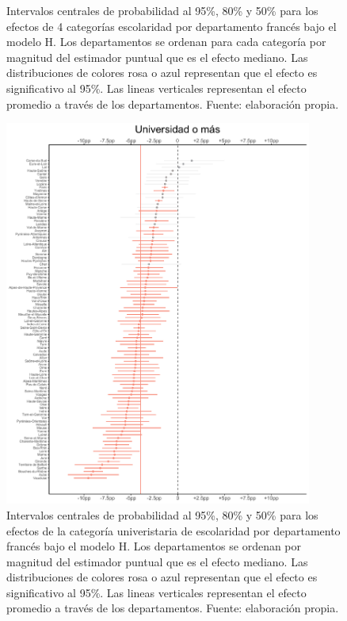 \begin{figure}
\begin{subfigure}{0.45\textwidth}
	\end{subfigure}
	\caption{Intervalos centrales de probabilidad al 95\%, 80\% y 50\% para los efectos de 4 categorías escolaridad por departamento francés bajo el modelo H. Los departamentos se ordenan para cada categoría por magnitud del estimador puntual que es el efecto mediano. Las distribuciones de colores rosa o azul representan que el efecto es significativo al 95\%. Las lineas verticales representan el efecto promedio a través de los departamentos. Fuente: elaboración propia.}
	\label{fig:Efectos_Escolaridad}
\end{figure}

\begin{figure}
	\centering
	\includegraphics[width = 0.9\textwidth]{Figs/Efectos/Efectos_Dip4_Modelo_H}
	\caption{Intervalos centrales de probabilidad al 95\%, 80\% y 50\% para los efectos de la categoría univeristaria de escolaridad por departamento francés bajo el modelo H. Los departamentos se ordenan por magnitud del estimador puntual que es el efecto mediano. Las distribuciones de colores rosa o azul representan que el efecto es significativo al 95\%. Las lineas verticales representan el efecto promedio a través de los departamentos. Fuente: elaboración propia.}
	\label{fig:Efectos_Universidad}
\end{figure}

